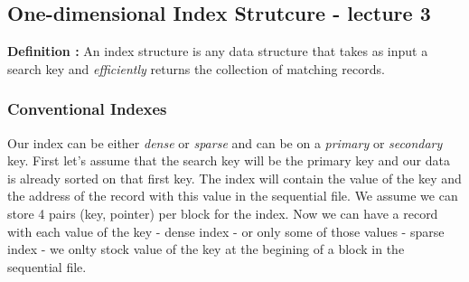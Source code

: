 \documentclass[12pt,a4paper]{article}
\begin{document}
\subsection{One-dimensional Index Strutcure - lecture 3}
\textbf{Definition :} An index structure is any data structure that takes as input a search key and \emph{efficiently} returns the collection of matching records.\\

\subsubsection{Conventional Indexes}
Our index can be either \emph{dense} or \emph{sparse} and can be on a \emph{primary} or \emph{secondary} key. First let's assume that the search key will be the primary key and our data is already sorted on that first key. The index will contain the value of the key and the address of the record with this value in the sequential file. We assume we can store 4 pairs (key, pointer) per block for the index. Now we can have a record with each value of the key - dense index - or only some of those values - sparse index - we onlty stock value of the key at the begining of a block in the sequential file.
\end{document}
